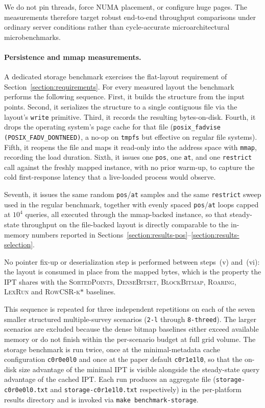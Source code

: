 \documentclass[manuscript,screen,review]{acmart}
\theoremstyle{definition}
\theoremstyle{plain}
\begin{document}
We do not pin threads, force NUMA placement, or configure huge pages.
The measurements therefore target robust end-to-end throughput
comparisons under ordinary server conditions rather than cycle-accurate
microarchitectural microbenchmarks.

\paragraph{Persistence and mmap measurements.}
A dedicated storage benchmark exercises the flat-layout requirement of
Section~\ref{section:requirements}. For every measured layout the
benchmark performs the following sequence. First, it builds the
structure from the input points. Second, it serializes the structure
to a single contiguous file via the layout's \texttt{write}
primitive. Third, it records the resulting bytes-on-disk. Fourth, it
drops the operating system's page cache for that file
(\texttt{posix\_fadvise (POSIX\_FADV\_DONTNEED)}, a no-op on
\texttt{tmpfs} but effective on regular file systems). Fifth, it
reopens the file and maps it read-only into the address space with
\texttt{mmap}, recording the load duration. Sixth, it issues one
\texttt{pos}, one \texttt{at}, and one \texttt{restrict} call against
the freshly mapped instance, with no prior warm-up, to capture the
cold first-response latency that a live-loaded process would observe.

Seventh, it issues the same
random \texttt{pos}/\texttt{at} samples and the same \texttt{restrict}
sweep used in the regular benchmark, together with evenly spaced
\texttt{pos}/\texttt{at} loops capped at $10^4$ queries, all executed
through the mmap-backed instance, so that steady-state throughput on the
file-backed layout is
directly comparable to the in-memory numbers reported in
Sections~\ref{section:results-pos}--\ref{section:results-selection}.

No pointer fix-up or deserialization step is performed between
steps~(v) and~(vi): the layout is consumed in place from the mapped
bytes, which is the property the IPT shares with the
\textsc{SortedPoints}, \textsc{DenseBitset}, \textsc{BlockBitmap},
\textsc{Roaring}, \textsc{LexRun} and \textsc{RowCSR-k\(*\)} baselines.

This sequence is repeated for three independent repetitions on
each of the seven smaller structured multiple-survey scenarios
(\texttt{2-l} through \texttt{8-threed}). The larger scenarios are
excluded because the dense bitmap baselines either exceed available
memory or do not finish within the per-scenario budget at full grid
volume. The storage benchmark is run twice, once at the
minimal-metadata cache configuration \texttt{c0r0e0l0} and once at the
paper default \texttt{c0r1e1l0}, so that the on-disk size advantage of
the minimal IPT is visible alongside the steady-state query advantage
of the cached IPT. Each run produces an aggregate file
(\texttt{storage-c0r0e0l0.txt} and \texttt{storage-c0r1e1l0.txt}
respectively) in the per-platform results directory and is invoked via
\texttt{make benchmark-storage}.
\end{document}
